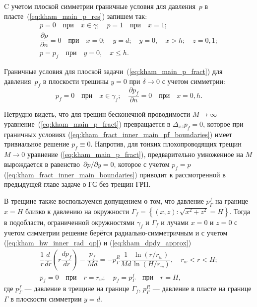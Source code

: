 \documentclass{article}
\newcommand{\mysub}[1]{%
  \par\vspace{0.5em}\noindent{\normalsize\underline{#1}}\par\vspace{0.5em}%
}
\begin{document}
C учетом плоской симметрии граничные условия для давления~$p$ в пласте~(\ref{eq:kham_main_p_res}) запишем так:
\begin{equation}
	\displaystyle
	\begin{gathered}
		p = 0 \quad \text{при} \quad x \in \gamma; \quad p=1 \quad \text{при} \quad x = 1; \\
		\dfrac{\partial p}{\partial n} = 0 \quad \text{при} \quad x=0; \quad
		y = d; \quad y = 0, \quad x > h; \quad z = 0,1; \\
		p = p_f \quad \text{при} \quad y = 0, \quad x \leq h.
	\end{gathered}
	\label{eq:kham_fract_inner_main_boundaries}
\end{equation}

Граничные условия для плоской задачи~(\ref{eq:kham_main_p_fract}) для давления~$p_f$ в 
плоскости трещины $y=0$ при $\delta \to 0$ с учетом симметрии:
\begin{equation}
	\displaystyle
	p_f = 0 \quad \text{при} \quad x \in \gamma_f; \quad \dfrac{\partial p_f}{\partial n} = 0 \quad \text{при} \quad x=0, h.
	\label{eq:kham_fract_inner_main_pf_boundaries}
\end{equation}

Нетрудно видеть, что для трещин бесконечной проводимости $M \to \infty$ уравнение~(\ref{eq:kham_main_p_fract}) 
превращается в $\Delta_{xz} p_f = 0$, которое при граничных
условиях (\ref{eq:kham_fract_inner_main_pf_boundaries}) имеет тривиальное решение $p_f \equiv 0$.
Напротив, для тонких плохопроводящих трещин $M \to 0$ уравнение (\ref{eq:kham_main_p_fract}),
предварительно умноженное на $M$ вырождается в равенство~$\partial p/\partial y = 0$, которое
с учетом $p_f = p$ (\ref{eq:kham_fract_inner_main_boundaries}) приводит к рассмотренной в
предыдущей главе задаче о ГС без трещин ГРП.

\mysub{Подобласть (I) $r_w \leq x < H$}
В трещине также воспользуемся допущением о том, что давление $p^f_{\Gamma}$ на
границе $x=H$ близко к давлению на окружности $\Gamma_f=\left\{\left(x,z\right): \sqrt{x^2 + z^2} = H \right\}$. %
Тогда в подобласти, ограниченной окружностями $\gamma_f$ и $\Gamma_f$ и лучами $x=0$ и $z=0$
с учетом симметрии решение берётся радиально-симметричным и с учетом (\ref{eq:kham_hw_inner_rad_qp}) и (\ref{eq:kham_dpdy_approx})
\begin{equation}
	\displaystyle
	\begin{gathered}
		\dfrac{1}{r}\dfrac{d}{dr}\left(r\dfrac{d p_f}{dr}\right) - \dfrac{p_f}{Md} =
		- p^R_{\Gamma}\dfrac{1}{Md} \dfrac{\ln{\left(r/r_w\right)}}{\ln{\left(H/r_w\right)}}, \quad r_w < r < H;    \\[8pt]
		p_f = 0 \quad \text{при} \quad r = r_w; \quad p_f = p^f_{\Gamma} \quad \text{при} \quad r = H,
	\end{gathered}
	\label{eq:kham_fract_inner_area_I_press_equation}
\end{equation}
где $p^f_{\Gamma}$ — давление в трещине на границе $\Gamma_f$, $p^R_{\Gamma}$ — давление в
пласте на границе $\Gamma$ в плоскости симметрии $y=d$.
\end{document}
